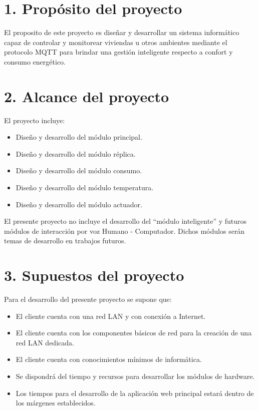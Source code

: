 \documentclass[11pt]{charter}
\begin{document}
\section{1. Propósito del proyecto}
\label{sec:proposito}

El proposito de este proyecto es diseñar y desarrollar un sistema informático capaz de controlar y monitorear viviendas u otros ambientes mediante el protocolo MQTT para brindar una gestión inteligente respecto a confort y consumo energético.


\section{2. Alcance del proyecto}
\label{sec:alcance}

El proyecto incluye: 
\begin{itemize}
\item Diseño y desarrollo del módulo principal.
\item Diseño y desarrollo del módulo réplica.
\item Diseño y desarrollo del módulo consumo.
\item Diseño y desarrollo del módulo temperatura.
\item Diseño y desarrollo del módulo actuador.
\end{itemize}

El presente proyecto no incluye el desarrollo del ``módulo inteligente'' y futuros módulos de interacción por voz Humano - Computador. Dichos módulos serán temas de desarrollo en trabajos futuros.

\section{3. Supuestos del proyecto}
\label{sec:supuestos}

Para el desarrollo del presente proyecto se supone que: 
\begin{itemize}
\item El cliente cuenta con una red LAN y con conexión a Internet.
\item El cliente cuenta con los componentes básicos de red para la creación de una red LAN dedicada.
\item El cliente cuenta con conocimientos mínimos de informática.
\item Se dispondrá del tiempo y recursos para desarrollar los módulos de hardware.
\item Los tiempos para el desarrollo de la aplicación web principal estará dentro de los márgenes establecidos.
\end{itemize}
\end{document}
